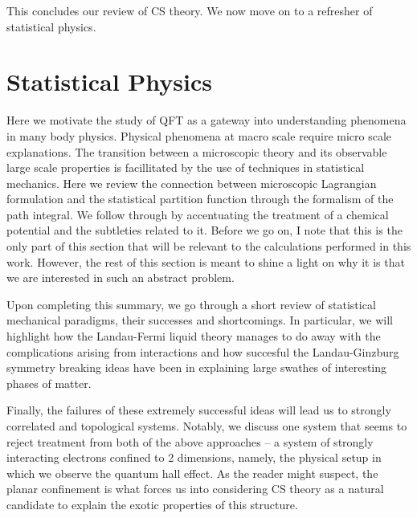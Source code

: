 This concludes our review of CS theory. We now move on to a refresher of statistical physics.


        \section{Statistical Physics}

        Here we motivate the study of QFT as a gateway into understanding phenomena in many body physics. Physical phenomena at macro scale require micro scale explanations. The transition between a microscopic theory and its observable large scale properties is facillitated by the use of techniques in statistical mechanics. Here we review the connection between microscopic Lagrangian formulation and the statistical partition function through the formalism of the path integral. We follow through by accentuating the treatment of a chemical potential and the subtleties related to it. Before we go on, I note that this is the only part of this section that will be relevant to the calculations performed in this work. However, the rest of this section is meant to shine a light on why it is that we are interested in such an abstract problem.

        Upon completing this summary, we go through a short review of statistical mechanical paradigms, their successes and shortcomings. In particular, we will highlight how the Landau-Fermi liquid theory manages to do away with the complications arising from interactions and how succesful the Landau-Ginzburg symmetry breaking ideas have been in explaining large swathes of interesting phases of matter. 

        Finally, the failures of these extremely successful ideas will lead us to strongly correlated and topological systems. Notably, we discuss one system that seems to reject treatment from both of the above approaches -- a system of strongly interacting electrons confined to 2 dimensions, namely, the physical setup in which we observe the quantum hall effect. As the reader might suspect, the planar confinement is what forces us into considering CS theory as a natural candidate to explain the exotic properties of this structure.
